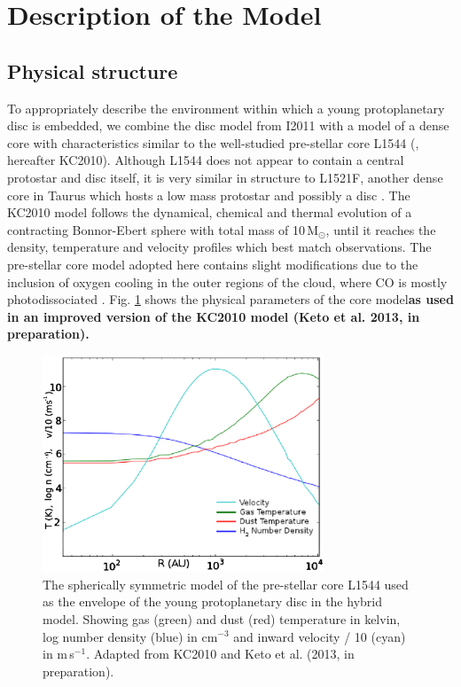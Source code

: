 \documentclass[useAMS,usenatbib]{mn2e}
\begin{document}
\section{Description of the Model} \label{sec:description_model}

\subsection{Physical structure} \label{subsec:physical_structure}

To appropriately describe the environment within which a young protoplanetary disc is embedded, we combine the disc model from I2011 with a model of a dense core with characteristics similar to the well-studied pre-stellar core L1544 (\citealt{Keto2010}, hereafter KC2010). Although L1544 does not appear to contain a central protostar and disc itself, it is very similar in structure to L1521F,  another dense core in Taurus which hosts a low mass protostar and possibly a disc \citep{Bourke2006}. The KC2010 model follows the dynamical, chemical and thermal evolution of a contracting Bonnor-Ebert sphere \citep{Bonnor1956,Ebert1957} with total mass of 10\,M$_{\odot}$, until it reaches the density, temperature and velocity profiles which best match observations. The pre-stellar core model adopted here contains slight modifications due to the inclusion of oxygen cooling in the outer regions of the cloud, where CO is mostly photodissociated \citep{Caselli2012}. Fig. \ref{fig:l1544_model} shows the physical parameters of the core model{\bf as used in an improved version of the KC2010 model (Keto et al. 2013, in preparation).}\smallskip

\begin{figure}
 \includegraphics[width=84mm]{Figures/model/fig01.eps}
 \caption{The spherically symmetric model of the pre-stellar core L1544 used as the envelope of the young protoplanetary disc in the hybrid model. Showing gas (green) and dust (red) temperature in kelvin, log number density (blue) in cm$^{-3}$ and inward velocity / 10 (cyan) in m$\,$s$^{-1}$. Adapted from KC2010 and Keto et al. (2013, in preparation).}
 \label{fig:l1544_model}
\end{figure}
\end{document}
